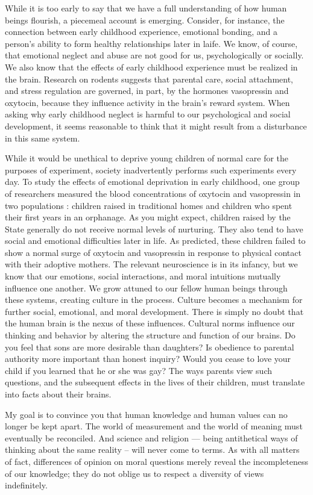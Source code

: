\documentclass[a4paper,12pt]{extbook}
\begin{document}
While it is too early to say that we have a full understanding of how human beings flourish, a piecemeal account is emerging.
Consider, for instance, the connection between early childhood experience, emotional bonding, and a person’s ability to form healthy relationships later in laife.
We know, of course, that emotional neglect and abuse are not good for us, psychologically or socially.
We also know that the effects of early childhood experience must be realized in the brain.
Research on rodents suggests that parental care, social attachment, and stress regulation are governed, in part, by the hormones vasopressin and oxytocin, because they influence activity in the brain’s reward system.
When asking why early childhood neglect is harmful to our psychological and social development, it seems reasonable to think that it might result from a disturbance in this same system.

While it would be unethical to deprive young children of normal care for the purposes of experiment, society inadvertently performs such experiments every day.
To study the effects of emotional deprivation in early childhood, one group of researchers measured the blood concentrations of oxytocin and vasopressin in two populations :
children raised in traditional homes and children who spent their first years in an orphanage.
As you might expect, children raised by the State generally do not receive normal levels of nurturing.
They also tend to have social and emotional difficulties later in life.
As predicted, these children failed to show a normal surge of oxytocin and vasopressin in response to physical contact with their adoptive mothers.
The relevant neuroscience is in its infancy, but we know that our emotions, social interactions, and moral intuitions mutually influence one another.
We grow attuned to our fellow human beings through these systems, creating culture in the process.
Culture becomes a mechanism for further social, emotional, and moral development.
There is simply no doubt that the human brain is the nexus of these influences.
Cultural norms influence our thinking and behavior by altering the structure and function of our brains.
Do you feel that sons are more desirable than daughters?
Is obedience to parental authority more important than honest inquiry?
Would you cease to love your child if you learned that he or she was gay?
The ways parents view such questions, and the subsequent effects in the lives of their children, must translate into facts about their brains.

My goal is to convince you that human knowledge and human values can no longer be kept apart.
The world of measurement and the world of meaning must eventually be reconciled.
And science and religion --- being antithetical ways of thinking about the same reality -- will never come to terms.
As with all matters of fact, differences of opinion on moral questions merely reveal the incompleteness of our knowledge;
they do not oblige us to respect a diversity of views indefinitely.
\end{document}
